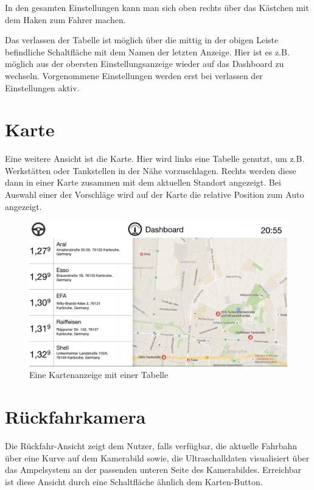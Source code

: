 \documentclass[pflichtenheft.tex]{subfiles}
\begin{document}
In den gesamten Einstellungen kann man sich oben rechts über das Kästchen mit dem Haken zum Fahrer machen.

Das verlassen der Tabelle ist möglich über die mittig in der obigen Leiste befindliche Schaltfläche mit dem Namen der letzten Anzeige. Hier ist es z.B. möglich aus der obersten Einstellungsanzeige wieder auf das Dashboard zu wechseln. Vorgenommene Einstellungen werden erst bei verlassen der Einstellungen aktiv.  


\clearpage
\section{Karte}
\label{sec:Karte}

Eine weitere Ansicht ist die Karte. Hier wird links eine Tabelle genutzt, um z.B. Werkstätten oder Tankstellen in der Nähe vorzuschlagen. Rechts werden diese dann in einer Karte zusammen mit dem aktuellen Standort angezeigt.
Bei Auswahl einer der Vorschläge wird auf der Karte die relative Position zum Auto angezeigt.
\begin{figure}[H]
  	\begin{center}
 		\includegraphics[width=\textwidth]{Images/GUI-Map.png}
  		\caption{Eine Kartenanzeige mit einer Tabelle}
  	\end{center}
\end{figure}

\clearpage
\section{Rückfahrkamera}

Die Rückfahr-Ansicht zeigt dem Nutzer, falls verfügbar, die aktuelle Fahrbahn über eine Kurve auf dem Kamerabild sowie, die Ultraschalldaten visualisiert über das Ampelsystem an der passenden unteren Seite des Kamerabildes. Erreichbar ist diese Ansicht durch eine Schaltfläche ähnlich dem Karten-Button.
\end{document}
